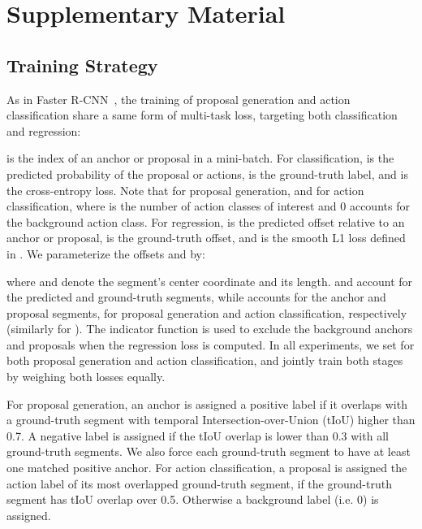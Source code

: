 \documentclass[10pt,twocolumn,letterpaper]{article}
\begin{document}
{\small


}


\clearpage

\appendix

\section{Supplementary Material}

\subsection{Training Strategy}

As in Faster R-CNN~\cite{ren:nips2015}, the training of proposal generation and
action classification share a same form of multi-task loss, targeting both
classification and regression:

 is the index of an anchor or proposal in a mini-batch. For classification,
 is the predicted probability of the proposal or actions,  is the
ground-truth label, and  is the cross-entropy loss. Note
that  for proposal generation, and  for
action classification, where  is the number of action classes of interest
and 0 accounts for the background action class. For regression,  is the
predicted offset relative to an anchor or proposal,  is the ground-truth
offset, and  is the smooth L1 loss defined in
\cite{girshick:iccv2015}. We parameterize the offsets  and
 by:

where  and  denote the segment's center coordinate and its length. 
and  account for the predicted and ground-truth segments, while 
accounts for the anchor and proposal segments, for proposal generation and
action classification, respectively (similarly for ). The indicator function
 is used to exclude the background anchors and proposals when the
regression loss is computed. In all experiments, we set  for both
proposal generation and action classification, and jointly train both stages by
weighing both losses equally.

For proposal generation, an anchor is assigned a positive label if it overlaps
with a ground-truth segment with temporal Intersection-over-Union (tIoU) higher
than 0.7. A negative label is assigned if the tIoU overlap is lower than 0.3
with all ground-truth segments. We also force each ground-truth segment to have
at least one matched positive anchor. For action classification, a proposal is
assigned the action label of its most overlapped ground-truth segment, if the
ground-truth segment has tIoU overlap over 0.5. Otherwise a background label
(i.e. 0) is assigned.
\end{document}
